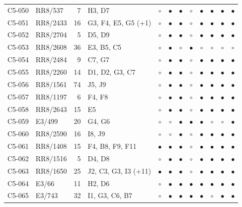 {\begin{longtable}{llrp{3.9cm}cccccccc}
    C5-050 & RR8/537 & 7 & H3, D7 & $\circ$ & $\bullet$ & $\bullet$ & $\circ$ & $\bullet$ & $\bullet$ & $\bullet$ & $\bullet$ \\
    C5-051 & RR8/2433 & 16 & G3, F4, E5, G5 (+1) & $\circ$ & $\bullet$ & $\bullet$ & $\circ$ & $\bullet$ & $\bullet$ & $\bullet$ & $\bullet$ \\
    C5-052 & RR8/2704 & 5 & D5, D9 & $\circ$ & $\bullet$ & $\bullet$ & $\circ$ & $\bullet$ & $\bullet$ & $\bullet$ & $\bullet$ \\
    C5-053 & RR8/2608 & 36 & E3, B5, C5 & $\circ$ & $\bullet$ & $\circ$ & $\bullet$ & $\circ$ & $\circ$ & $\circ$ & $\circ$ \\
    C5-054 & RR8/2484 & 9 & C7, G7 & $\circ$ & $\bullet$ & $\bullet$ & $\circ$ & $\bullet$ & $\bullet$ & $\bullet$ & $\bullet$ \\
    C5-055 & RR8/2260 & 14 & D1, D2, G3, C7 & $\circ$ & $\bullet$ & $\bullet$ & $\circ$ & $\bullet$ & $\bullet$ & $\bullet$ & $\bullet$ \\
    C5-056 & RR8/1561 & 74 & J5, J9 & $\circ$ & $\bullet$ & $\bullet$ & $\circ$ & $\bullet$ & $\bullet$ & $\bullet$ & $\bullet$ \\
    C5-057 & RR8/1197 & 6 & F4, F8 & $\circ$ & $\bullet$ & $\bullet$ & $\circ$ & $\bullet$ & $\bullet$ & $\bullet$ & $\bullet$ \\
    C5-058 & RR8/2643 & 15 & E5 & $\circ$ & $\bullet$ & $\bullet$ & $\circ$ & $\bullet$ & $\bullet$ & $\bullet$ & $\bullet$ \\
    C5-059 & E3/499 & 20 & G4, G6 & $\circ$ & $\circ$ & $\bullet$ & $\bullet$ & $\bullet$ & $\circ$ & $\circ$ & $\bullet$ \\
    C5-060 & RR8/2590 & 16 & I8, J9 & $\circ$ & $\circ$ & $\bullet$ & $\circ$ & $\bullet$ & $\bullet$ & $\bullet$ & $\bullet$ \\
    C5-061 & RR8/1408 & 15 & F4, B8, F9, F11 & $\bullet$ & $\bullet$ & $\bullet$ & $\circ$ & $\bullet$ & $\bullet$ & $\bullet$ & $\bullet$ \\
    C5-062 & RR8/1516 & 5 & D4, D8 & $\circ$ & $\bullet$ & $\bullet$ & $\circ$ & $\bullet$ & $\bullet$ & $\bullet$ & $\bullet$ \\
    C5-063 & RR8/1650 & 25 & J2, C3, G3, I3 (+11) & $\bullet$ & $\bullet$ & $\bullet$ & $\circ$ & $\bullet$ & $\bullet$ & $\bullet$ & $\bullet$ \\
    C5-064 & E3/66 & 11 & H2, D6 & $\circ$ & $\bullet$ & $\bullet$ & $\bullet$ & $\bullet$ & $\bullet$ & $\bullet$ & $\bullet$ \\
    C5-065 & E3/743 & 32 & I1, G3, C6, B7 & $\circ$ & $\bullet$ & $\bullet$ & $\bullet$ & $\bullet$ & $\circ$ & $\bullet$ & $\bullet$ \\

\end{longtable}}
